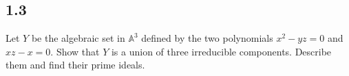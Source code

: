 \subsection*{1.3}

Let $Y$ be the algebraic set in $\mathbb{A}^3$ defined by the two polynomials $x^2 - yz = 0$ and $xz - x = 0$.
Show that $Y$ is a union of three irreducible components.  Describe them and find their prime ideals.
